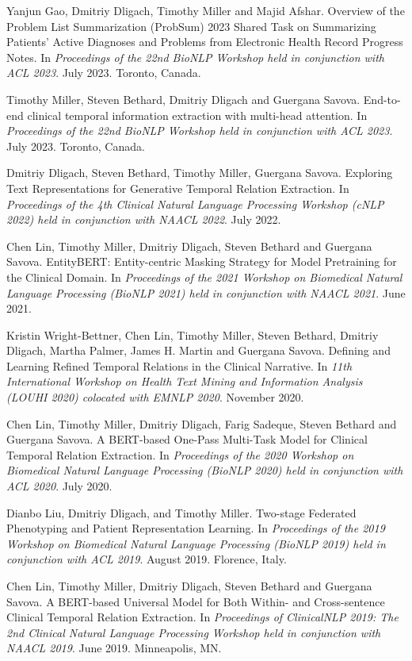 \documentclass[letterpaper]{article}
\renewenvironment{itemize}{
  \begin{list}{}{
    \setlength{\leftmargin}{1.5em}
  }
}{
  \end{list}
}
\begin{document}
\begin{itemize}
\item Yanjun Gao, Dmitriy Dligach, Timothy Miller and Majid Afshar. Overview of the Problem List Summarization (ProbSum) 2023 Shared Task on Summarizing Patients' Active Diagnoses and Problems from Electronic Health Record Progress Notes. In \emph{Proceedings of the 22nd BioNLP Workshop held in conjunction with ACL 2023}. July 2023. Toronto, Canada.
\item Timothy Miller, Steven Bethard, Dmitriy Dligach and Guergana Savova. End-to-end clinical temporal information extraction with multi-head attention. In \emph{Proceedings of the 22nd BioNLP Workshop held in conjunction with ACL 2023}. July 2023. Toronto, Canada.
\item Dmitriy Dligach, Steven Bethard, Timothy Miller, Guergana Savova. Exploring Text Representations for Generative Temporal Relation Extraction. In \emph{Proceedings of the 4th Clinical Natural Language Processing Workshop (cNLP 2022) held in conjunction with NAACL 2022}. July 2022.
\item Chen Lin, Timothy Miller, Dmitriy Dligach, Steven Bethard and Guergana Savova. EntityBERT: Entity-centric Masking Strategy for Model Pretraining for the Clinical Domain. In \emph{Proceedings of the 2021 Workshop on Biomedical Natural Language Processing (BioNLP 2021) held in conjunction with NAACL 2021}. June 2021.
\item Kristin Wright-Bettner, Chen Lin, Timothy Miller, Steven Bethard, Dmitriy Dligach, Martha Palmer, James H. Martin and Guergana Savova. Defining and Learning Refined Temporal Relations in the Clinical Narrative. In \emph{11th International Workshop on Health Text Mining and Information Analysis (LOUHI 2020) colocated with EMNLP 2020}. November 2020.
\item Chen Lin, Timothy Miller, Dmitriy Dligach, Farig Sadeque, Steven Bethard and Guergana Savova. A BERT-based One-Pass Multi-Task Model for Clinical Temporal Relation Extraction. In \emph{Proceedings of the 2020 Workshop on Biomedical Natural Language Processing (BioNLP 2020) held in conjunction with ACL 2020}. July 2020.
\item Dianbo Liu, Dmitriy Dligach, and Timothy Miller. Two-stage Federated Phenotyping and Patient Representation Learning. In \emph{Proceedings of the 2019 Workshop on Biomedical Natural Language Processing (BioNLP 2019) held in conjunction with ACL 2019}. August 2019. Florence, Italy.
\item Chen Lin, Timothy Miller, Dmitriy Dligach, Steven Bethard and Guergana Savova. A BERT-based Universal Model for Both Within- and Cross-sentence Clinical Temporal Relation Extraction. In \emph{Proceedings of ClinicalNLP 2019: The 2nd Clinical Natural Language Processing Workshop held in conjunction with NAACL 2019}. June 2019. Minneapolis, MN.

\end{itemize}
\end{document}
